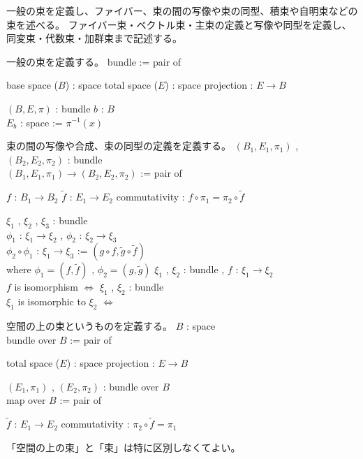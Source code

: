 一般の束を定義し、ファイバー、束の間の写像や束の同型、積束や自明束などの束を述べる。
ファイバー束・ベクトル束・主束の定義と写像や同型を定義し、同変束・代数束・加群束まで記述する。

\begin{Definition}
\itemnote
  一般の束を定義する。
\itemdefi
  \Define bundle := pair of
  \begin{itemize}
    \itemenum base space (\(B\)) : space
    \itemenum total space (\(E\)) : space
    \itemenum projection : \(E \to B\)
  \end{itemize}
\itemdefi
  \For \((B , E , \pi)\) : bundle \(b\) : \(B\) \\
  \Define \(E_b\) : space := \(\pi^{-1}(x)\)
\end{Definition}

\begin{Definition}
\itemnote
  束の間の写像や合成、束の同型の定義を定義する。
\itemdefi
  \For \((B_1 , E_1 , \pi_1)\) , \((B_2 , E_2 , \pi_2)\) : bundle \\
  \Define \((B_1 , E_1 , \pi_1) \to (B_2 , E_2 , \pi_2)\) := pair of
  \begin{itemize}
    \itemenum \(f\) : \(B_1 \to B_2\)
    \itemenum \(\tilde{f}\) : \(E_1 \to E_2\)
    \itemwith commutativity : \(f \circ \pi_1 = \pi_2 \circ \tilde{f}\)
  \end{itemize}
\itemdefi
  \For \(\xi_1\) , \(\xi_2\) , \(\xi_3\) : bundle \\
  \For \(\phi_1\) : \(\xi_1 \to \xi_2\) , \(\phi_2\) : \(\xi_2 \to \xi_3\) \\
  \Define \(\phi_2 \circ \phi_1\) : \(\xi_1 \to \xi_3\) := \((g \circ f , \tilde{g} \circ \tilde{f})\) \\
  where \(\phi_1 = (f , \tilde{f})\) , \(\phi_2 = (g , \tilde{g})\)
\itemdefi
  \For \(\xi_1\) , \(\xi_2\) : bundle , \(f\) : \(\xi_1 \to \xi_2\) \\
  \Define \(f\) is isomorphism \(\iff\) 
\itemdefi
  \For \(\xi_1\) , \(\xi_2\) : bundle \\
  \Define \(\xi_1\) is isomorphic to \(\xi_2\) \(\iff\) 
\end{Definition}

\begin{Definition}
\itemnote
  空間の上の束というものを定義する。
\itemdefi
  \For \(B\) : space \\
  \Define bundle over \(B\) := pair of
  \begin{itemize}
    \itemenum total space (\(E\)) : space
    \itemenum projection : \(E \to B\)
  \end{itemize}
\itemdefi
  \For \((E_1 , \pi_1)\) , \((E_2 , \pi_2)\) : bundle over \(B\) \\
  \Define map over \(B\) := pair of
  \begin{itemize}
    \itemenum \(\tilde{f}\) : \(E_1 \to E_2\)
    \itemwith commutativity : \(\pi_2 \circ \tilde{f} = \pi_1\)
  \end{itemize}
\itemnote
  「空間の上の束」と「束」は特に区別しなくてよい。
\end{Definition}

